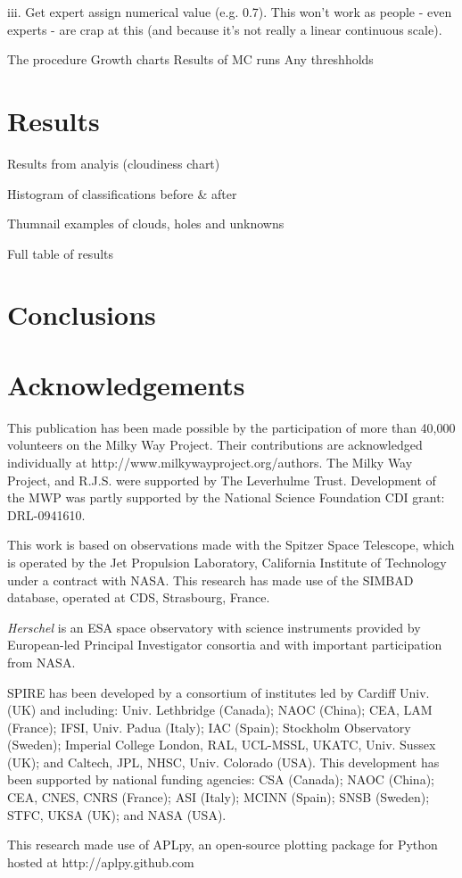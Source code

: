 \documentclass[a4,useAMS,usenatbib]{mn2e}
\begin{document}
		iii. Get expert assign numerical value (e.g. 0.7). This won't work as people - even experts - are crap at this (and because it's not really a linear continuous scale). 
		
		
	

The procedure
Growth charts
Results of MC runs
Any threshholds


\section{Results}
Results from analyis (cloudiness chart)

Histogram of classifications before \& after

Thumnail examples of clouds, holes and unknowns

Full table of results

\section{Conclusions}


\section{Acknowledgements}
This publication has been made possible by the participation of more than 40,000 volunteers on the Milky Way Project. Their contributions are acknowledged individually at http://www.milkywayproject.org/authors. The Milky Way Project, and R.J.S. were supported by The Leverhulme Trust. Development of the MWP was partly supported by the National Science Foundation CDI grant: DRL-0941610. 

This work is based on observations made with the Spitzer Space Telescope, which is operated by the Jet Propulsion Laboratory, California Institute of Technology under a contract with NASA. This research has made use of the SIMBAD database, operated at CDS, Strasbourg, France.

{\em Herschel} is an ESA space observatory with science instruments
provided by European-led Principal Investigator consortia and with important
participation from NASA.

SPIRE has been developed by a consortium of institutes led by Cardiff
Univ. (UK) and including: Univ. Lethbridge (Canada); NAOC (China);
CEA, LAM (France); IFSI, Univ. Padua (Italy); IAC (Spain); Stockholm
Observatory (Sweden); Imperial College London, RAL, UCL-MSSL, UKATC,
Univ. Sussex (UK); and Caltech, JPL, NHSC, Univ. Colorado (USA). This
development has been supported by national funding agencies: CSA
(Canada); NAOC (China); CEA, CNES, CNRS (France); ASI (Italy); MCINN
(Spain); SNSB (Sweden); STFC, UKSA (UK); and NASA (USA).

This research made use of APLpy, an open-source plotting package for
Python hosted at http://aplpy.github.com



\end{document}
